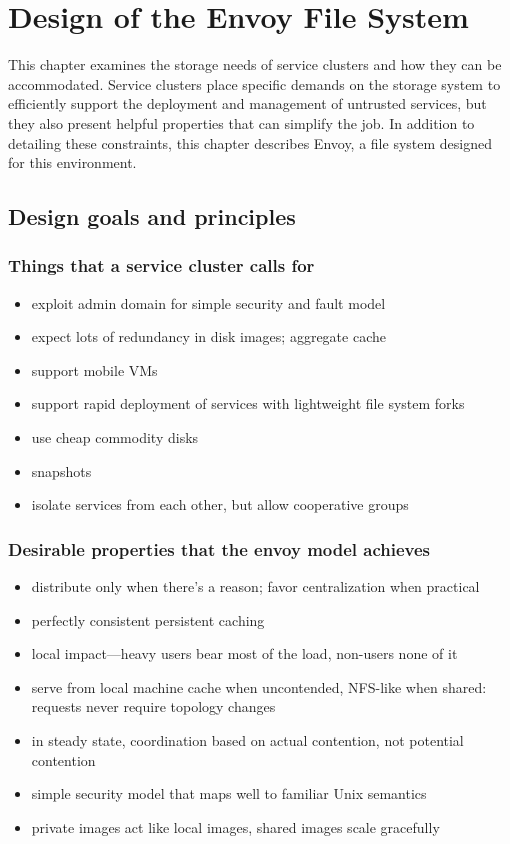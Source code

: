 \chapter{Design of the Envoy File System}

This chapter examines the storage needs of service clusters and how they can be accommodated. Service clusters place specific demands on the storage system to efficiently support the deployment and management of untrusted services, but they also present helpful properties that can simplify the job. In addition to detailing these constraints, this chapter describes Envoy, a file system designed for this environment.

\section{Design goals and principles}

\subsection{Things that a service cluster calls for}
\begin{itemize}
\item exploit admin domain for simple security and fault model
\item expect lots of redundancy in disk images; aggregate cache
\item support mobile VMs
\item support rapid deployment of services with lightweight file system forks
\item use cheap commodity disks
\item snapshots
\item isolate services from each other, but allow cooperative groups
\end{itemize}

\subsection{Desirable properties that the envoy model achieves}
\begin{itemize}
\item distribute only when there's a reason; favor centralization when practical
\item perfectly consistent persistent caching
\item local impact---heavy users bear most of the load, non-users none of it
\item serve from local machine cache when uncontended, NFS-like when shared: requests never require topology changes
\item in steady state, coordination based on actual contention, not potential contention
\item simple security model that maps well to familiar Unix semantics
\item private images act like local images, shared images scale gracefully
\end{itemize}

